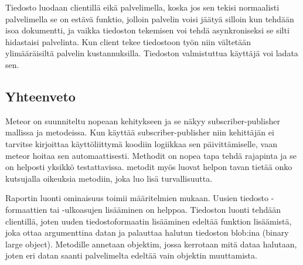 Tiedosto luodaan clientillä eikä palvelimella, koska jos sen tekisi normaalisti palvelimella se on estävä funktio,
jolloin palvelin voisi jäätyä silloin kun tehdään isoa dokumentti, ja 
vaikka tiedoston tekemisen voi tehdä asynkroniseksi se silti hidastaisi palvelinta. 
Kun client tekee tiedostoon työn niin vältetään ylimääräisiltä palvelin kustannuksilla.
Tiedoston valmistuttua käyttäjä voi ladata sen.
\medskip


\subsection*{Yhteenveto}

Meteor on suunniteltu nopeaan kehitykseen ja se näkyy subscriber-publisher mallissa ja metodeissa.
Kun käyttää subscriber-publisher niin kehittäjän ei tarvitse kirjoittaa käyttöliittymä koodiin logiikkaa sen päivittämiselle, vaan meteor hoitaa sen automaattisesti.
Methodit on nopea tapa tehdä rajapinta ja se on helposti yksikkö testattavissa. metodit myös luovat helpon tavan tietää onko kutsujalla oikeuksia metodiin, joka luo lisä turvallisuutta.
\medskip

Raportin luonti ominaisuus toimii määritelmien mukaan.
%
Uusien tiedosto -formaattien tai -ulkoasujen lisääminen on helppoa. 
Tiedoston luonti tehdään clientillä, joten uuden tiedostoformaatin lisääminen edeltää funktion lisäämistä, 
joka ottaa argumenttina datan ja palauttaa halutun tiedoston blob:ina (binary large object).
%
Metodille annetaan objektim, jossa kerrotaan mitä dataa halutaan, joten eri datan saanti palvelimelta edeltää vain objektin muuttamista.





